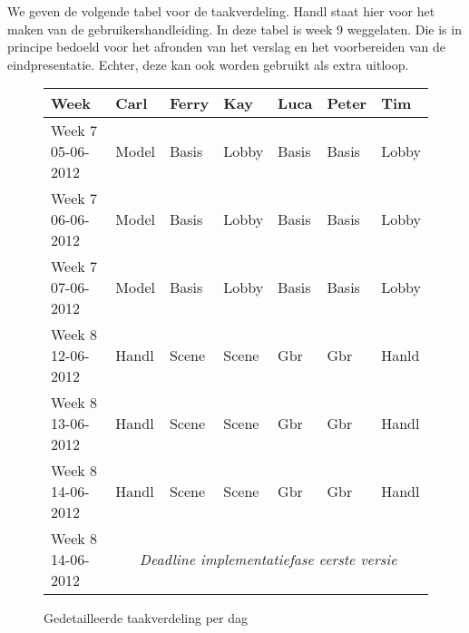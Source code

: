 \documentclass[a4paper,11pt]{article}
\begin{document}
    We geven de volgende tabel voor de taakverdeling. Handl staat hier voor het maken van de gebruikershandleiding. In deze tabel is week 9 weggelaten. Die is in principe bedoeld voor het afronden van het verslag en het voorbereiden van de eindpresentatie. Echter, deze kan ook worden gebruikt als extra uitloop.
   \begin{figure}[H]
        \small
        \centering
        \begin{tabular}{| l | l | l | l | l | l | l |}
        \hline
        Week & Carl & Ferry & Kay & Luca & Peter & Tim \\ \hline
        Week 7 05-06-2012 & Model & Basis & Lobby & Basis & Basis & Lobby \\ \hline
        Week 7 06-06-2012 & Model & Basis & Lobby & Basis & Basis & Lobby \\ \hline
        Week 7 07-06-2012 & Model & Basis & Lobby & Basis & Basis & Lobby \\ \hline
        Week 8 12-06-2012 & Handl & Scene & Scene & Gbr & Gbr & Hanld \\ \hline
        Week 8 13-06-2012 & Handl & Scene & Scene & Gbr & Gbr & Handl \\ \hline
        Week 8 14-06-2012 & Handl & Scene & Scene & Gbr & Gbr & Handl \\ \hline
        Week 8 14-06-2012 & \multicolumn{6}{|c|}{\emph{Deadline implementatiefase eerste versie}} \\ \hline
        \end{tabular}
        \caption{Gedetailleerde taakverdeling per dag}
        \label{tab:planning}
    \end{figure}
\end{document}
